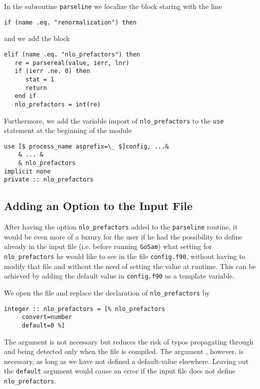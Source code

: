 \documentclass[11pt,a4paper]{refrep}
\newcommand{\golem}{{\tt GoSam}\xspace}
\begin{document}
In the subroutine \texttt{parseline} we localize the block staring
with the line
\begin{lstlisting}
if (name .eq. "renormalization") then
\end{lstlisting}
and we add the block
\begin{lstlisting}
elif (name .eq. "nlo_prefactors") then
   re = parsereal(value, ierr, lnr)
   if (ierr .ne. 0) then
      stat = 1
      return
   end if
   nlo_prefactors = int(re)
\end{lstlisting}

Furthermore, we add the variable import of \texttt{nlo\_prefactors}
to the \texttt{use} statement at the beginning of the module
\begin{lstlisting}
use [$ process_name asprefix=\_ $]config, ...&
    & ... &
    & nlo_prefactors
implicit none
private :: nlo_prefactors
\end{lstlisting}

\subsection{Adding an Option to the Input File}
After having the option \texttt{nlo\_prefactors} added to the
\texttt{parseline} routine,
it would be even more of a luxury for the user if he had the possibility
to define already in the input file (i.e. before running \golem{}) what
setting for \texttt{nlo\_prefactors} he would like to see in the file
\texttt{config.f90}, without having to modify that file and without the
need of setting the value at runtime. This can be achieved by adding
the default value in \texttt{config.f90} as a template variable.

We open the file 
and replace the declaration of \texttt{nlo\_prefactors} by
\begin{lstlisting}
integer :: nlo_prefactors = [% nlo_prefactors
     convert=number
     default=0 %]
\end{lstlisting}
The argument  is not necessary but reduces the risk
of typos propagating through and being detected only when the file is
compiled. The argument , however, is necessary, as long
as we have not defined a default-value elsewhere. Leaving out the
\texttt{default} argument would cause an error if the input file does
not define \texttt{nlo\_prefactors}.
\end{document}
